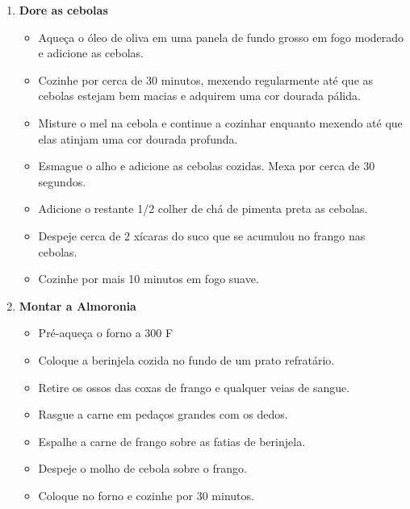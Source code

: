 \documentclass [11pt, papel de carta] {article}
\newcommand \fileName {Almoronia}
\begin{document}
\begin {description}
\begin {enumerate}
\item {\bf Dore as cebolas}
\begin {itemize}
\item Aqueça o óleo de oliva em uma panela de fundo grosso em fogo moderado e adicione as cebolas.
\item Cozinhe por cerca de 30 minutos, mexendo regularmente até que as cebolas estejam bem macias e adquirem uma cor dourada pálida.
\item Misture o mel na cebola e continue a cozinhar enquanto mexendo até que elas atinjam uma cor dourada profunda.
\item Esmague o alho e adicione as cebolas cozidas. Mexa por cerca de 30 segundos.
\item Adicione o restante 1/2 colher de chá de pimenta preta as cebolas.
\item Despeje cerca de 2 xícaras do suco que se acumulou no frango nas cebolas.
\item Cozinhe por mais 10 minutos em fogo suave.
\end {itemize}
\item {\bf Montar a Almoronia}
\begin {itemize}
\item Pré-aqueça o forno a 300 F
\item Coloque a berinjela cozida no fundo de um prato refratário.
\item Retire os ossos das coxas de frango e qualquer veias de sangue.
\item Rasgue a carne em pedaços grandes com os dedos.
\item Espalhe a carne de frango sobre as fatias de berinjela.
\item Despeje o molho de cebola sobre o frango.
\item Coloque no forno e cozinhe por 30 minutos.
\end {itemize}
\end {enumerate}
\end {description}

\end{document}
